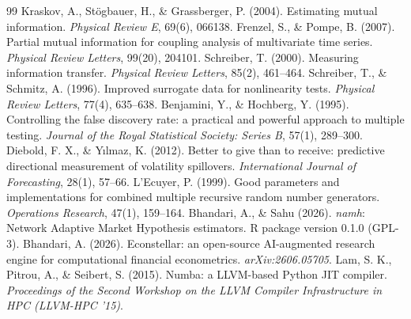 \documentclass[11pt]{article}
\begin{document}
\begin{thebibliography}{99}
\setlength{\itemsep}{2pt}
 Kraskov, A., St\"ogbauer, H., \& Grassberger, P. (2004).
Estimating mutual information. \emph{Physical Review E}, 69(6), 066138.
 Frenzel, S., \& Pompe, B. (2007). Partial mutual
information for coupling analysis of multivariate time series. \emph{Physical
Review Letters}, 99(20), 204101.
 Schreiber, T. (2000). Measuring information transfer.
\emph{Physical Review Letters}, 85(2), 461--464.
 Schreiber, T., \& Schmitz, A. (1996). Improved surrogate
data for nonlinearity tests. \emph{Physical Review Letters}, 77(4), 635--638.
 Benjamini, Y., \& Hochberg, Y. (1995). Controlling the
false discovery rate: a practical and powerful approach to multiple testing.
\emph{Journal of the Royal Statistical Society: Series B}, 57(1), 289--300.
 Diebold, F. X., \& Y\i lmaz, K. (2012). Better to
give than to receive: predictive directional measurement of volatility
spillovers. \emph{International Journal of Forecasting}, 28(1), 57--66.
 L'Ecuyer, P. (1999). Good parameters and implementations
for combined multiple recursive random number generators. \emph{Operations
Research}, 47(1), 159--164.
 Bhandari, A., \& Sahu (2026). \emph{namh}: Network Adaptive
Market Hypothesis estimators. R package version 0.1.0 (GPL-3).
 Bhandari, A. (2026). Econstellar: an open-source
AI-augmented research engine for computational financial econometrics.
\emph{arXiv:2606.05705}.
 Lam, S. K., Pitrou, A., \& Seibert, S. (2015). Numba: a
LLVM-based Python JIT compiler. \emph{Proceedings of the Second Workshop on the
LLVM Compiler Infrastructure in HPC (LLVM-HPC '15)}.
\end{thebibliography}
\end{document}
